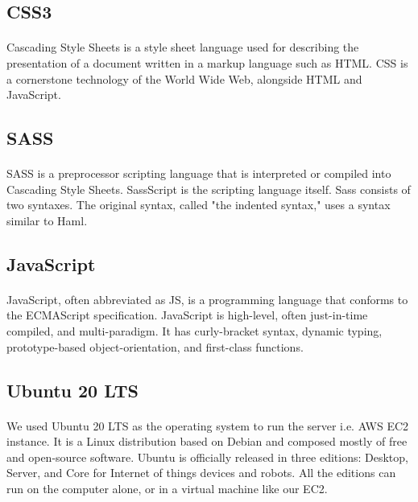 \documentclass[12pt, a4paper]{extarticle}
\begin{document}
       \subsection{CSS3}
            \paragraph{} Cascading Style Sheets is a style sheet language used for describing the presentation of a document written in a markup language such as HTML. CSS is a cornerstone technology of the World Wide Web, alongside HTML and JavaScript.
        \subsection{SASS}
            \paragraph{} SASS is a preprocessor scripting language that is interpreted or compiled into Cascading Style Sheets. SassScript is the scripting language itself. Sass consists of two syntaxes. The original syntax, called "the indented syntax," uses a syntax similar to Haml.
        \subsection{JavaScript}
            \paragraph{} JavaScript, often abbreviated as JS, is a programming language that conforms to the ECMAScript specification. JavaScript is high-level, often just-in-time compiled, and multi-paradigm. It has curly-bracket syntax, dynamic typing, prototype-based object-orientation, and first-class functions.
        \subsection{Ubuntu 20 LTS}
            \paragraph{} We used Ubuntu 20 LTS as the operating system to run the server i.e. AWS EC2 instance. It is a Linux distribution based on Debian and composed mostly of free and open-source software. Ubuntu is officially released in three editions: Desktop, Server, and Core for Internet of things devices and robots. All the editions can run on the computer alone, or in a virtual machine like our EC2.
\end{document}
